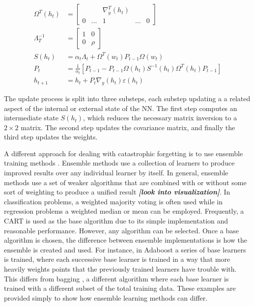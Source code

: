 	\begin{align}
		\Omega^T(h_t) &= \begin{bmatrix}
			&& \nabla_y^T(h_t) && \\ 0 & ... & 1 & ... & 0
		\end{bmatrix} \\
		\Lambda_{T}^{-1} &= \begin{bmatrix}
			1&0\\0&\rho
		\end{bmatrix} \\
		S(h_t) &= \alpha_t\Lambda_t + \Omega^T(w_t)P_{t-1}\Omega(w_t) \\
		P_t &= \frac{1}{\alpha_t}[P_{t-1}-P_{t-1}\Omega(h_t)S^{-1}(h_t)\Omega^T(h_t)P_{t-1}]\\
		h_{t+1} &= h_t + P_t \nabla_y(h_t)\varepsilon(h_t) 
	\end{align}
	\par The update process is split into three substeps, each substep updating a a related aspect of the internal or external state of the NN. The first step computes an intermediate state $S(h_t)$, which reduces the necessary matrix inversion to a $2\times2$ matrix. The second step updates the covariance matrix, and finally the third step updates the weights. 
	\par A different approach for dealing with catastrophic forgetting is to use ensemble training methods \cite{placeholderCitation}. Ensemble methods use a collection of learners to produce improved results over any individual learner by itself. In general, ensemble methods use a set of weaker algorithms that are combined with or without some sort of weighting to produce a unified result \textbf{\textit{[look into visualization]}}. In classification problems, a weighted majority voting is often used while in regression problems a weighted median or mean can be employed. Frequently, a CART is used as the base algorithm due to its simple implementation and reasonable performance. However, any algorithm can be selected. Once a base algorithm is chosen, the difference between ensemble implementations is how the ensemble is created and used. For instance, in Adaboost \cite{placeholderCitation} a series of base learners is trained, where each successive base learner is trained in a way that more heavily weights points that the previously trained learners have trouble with. This differs from bagging \cite{placeholderCitation}, a different algorithm where each base learner is trained with a different subset of the total training data. These examples are provided simply to show how ensemble learning methods can differ.
